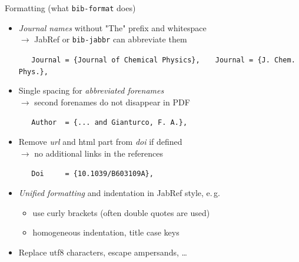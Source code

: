 \documentclass[xcolor={table,dvipsnames}]{beamer}
\renewcommand{\emph}[1]{\textit{\color{orange!90!brown}#1}}
\newcommand{\faint}{\color{black!10!gray}}
\begin{document}
\begin{frame}[fragile]{Formatting (what \texttt{bib-format} does)}
  \begin{itemize}

    \item \emph{Journal names} without "The" prefix and whitespace\\
      $\rightarrow$ JabRef or \texttt{bib-jabbr} can abbreviate them

      {\faint\verb!   Journal = {Journal of Chemical Physics},!}
      {\faint\verb!   Journal = {J. Chem. Phys.},!}

    \item Single spacing for \emph{abbreviated forenames}\\
      $\rightarrow$ second forenames do not disappear in {\small PDF}

      {\faint\verb!   Author  = {... and Gianturco, F. A.},!}

    \item Remove \emph{url} and html part from \emph{doi} if defined\\
      $\rightarrow$ no additional links in the references

      {\faint\verb!   Doi     = {10.1039/B603109A},!}

    \item \emph{Unified formatting} and indentation in  JabRef style, e.\,g.
      \begin{itemize}
        \item use curly brackets (often double quotes are used)
        \item homogeneous indentation, title case keys
      \end{itemize}

    \item Replace utf8 characters, escape ampersands, \ldots

  \end{itemize}
\end{frame}
\end{document}
